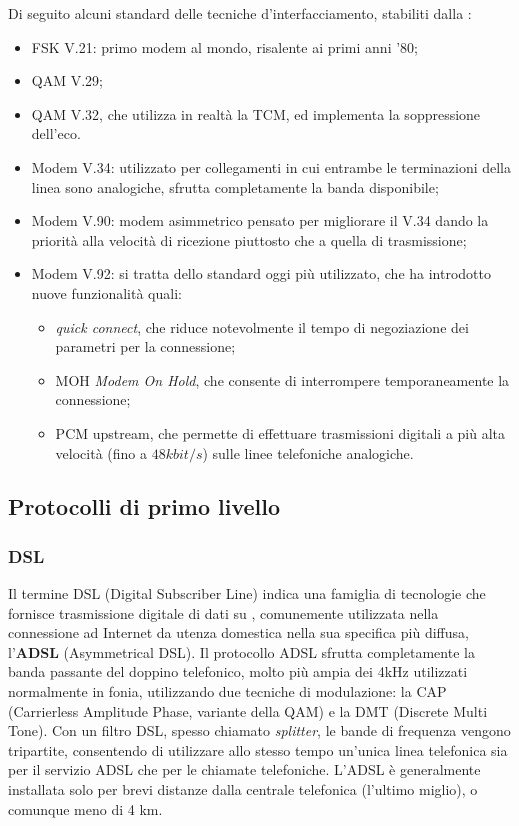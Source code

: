\documentclass[a4paper,11pt]{article}
\def\sub#1{\subsection{#1}\label{#1}}
\def\subsub#1{\subsubsection{#1}\label{#1}}
\def\vedi#1{\nameref{#1}}
\begin{document}
Di seguito alcuni standard delle tecniche d'interfacciamento,  stabiliti dalla \vedi{CCITT}:
\begin{itemize} %
\item FSK V.21: primo modem al mondo, risalente ai primi anni '80;
\item QAM V.29;
\item QAM V.32, che utilizza in realtà la TCM, ed implementa la soppressione dell'eco. %
\item Modem V.34: utilizzato per collegamenti in cui entrambe le terminazioni della linea sono analogiche, sfrutta completamente la banda disponibile;
\item Modem V.90: modem asimmetrico pensato per migliorare il V.34 dando la priorità alla velocità di ricezione piuttosto che a quella di trasmissione;
\item Modem V.92: si tratta dello standard oggi più utilizzato, che ha introdotto nuove funzionalità quali:
\begin{itemize}
\item \textit{quick connect}, che riduce notevolmente il tempo di negoziazione dei parametri per la connessione;
\item MOH \textit{Modem On Hold}, che consente di interrompere temporaneamente la connessione;
\item PCM upstream, che permette di effettuare trasmissioni digitali a più alta velocità (fino a $48 kbit/s$) sulle linee telefoniche analogiche.
\end{itemize}
\end{itemize}
\sub{Protocolli di primo livello}
\subsub{DSL}
Il termine DSL (Digital Subscriber Line) indica una famiglia di tecnologie che fornisce trasmissione digitale di dati su \vedi{Doppino telefonico}, comunemente utilizzata nella connessione ad Internet da utenza domestica nella sua specifica più diffusa, l'\textbf{ADSL} (Asymmetrical DSL). Il protocollo ADSL sfrutta completamente la banda passante del doppino telefonico, molto più ampia dei 4kHz utilizzati normalmente in fonia, utilizzando due tecniche di modulazione: la CAP (Carrierless Amplitude Phase, variante della QAM) e la DMT (Discrete Multi Tone).
Con un filtro DSL, spesso chiamato \textit{splitter}, le bande di frequenza vengono tripartite, consentendo di utilizzare  allo stesso tempo un'unica linea telefonica sia per il servizio ADSL che per le chiamate telefoniche. L'ADSL è generalmente installata solo per brevi distanze dalla centrale telefonica (l'ultimo miglio), o comunque meno di 4 km.
\end{document}
